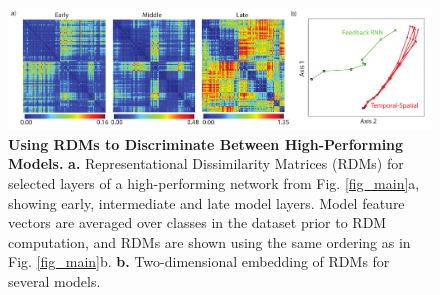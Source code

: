 \begin{figure}
\includegraphics [width=1\linewidth]{figures/rdms.pdf}
\vspace{-3mm}
\caption{\footnotesize{\textbf{Using RDMs to Discriminate Between High-Performing Models.} \textbf{a.} Representational Dissimilarity Matrices (RDMs) for selected layers of a high-performing network from Fig. \ref{fig_main}a, showing early, intermediate and late model layers.  Model feature vectors are averaged over classes in the dataset prior to RDM computation, and RDMs are shown using the same ordering as in Fig. \ref{fig_main}b. \textbf{b.} Two-dimensional embedding of RDMs for several models.}~\label{fig_rdms}}
\vspace{-5mm}
\end{figure}



